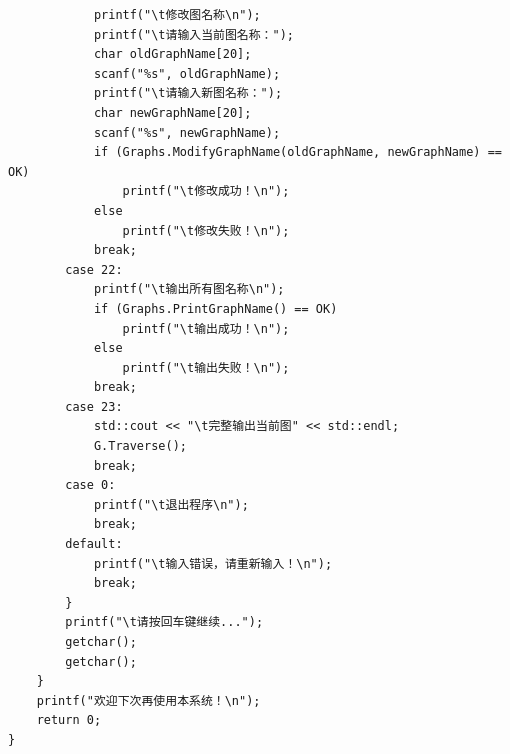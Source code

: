 \documentclass[supercite]{Experimental_Report}
\theoremstyle{definition}
\begin{document}
\begin{lstlisting}
            printf("\t修改图名称\n");
            printf("\t请输入当前图名称：");
            char oldGraphName[20];
            scanf("%s", oldGraphName);
            printf("\t请输入新图名称：");
            char newGraphName[20];
            scanf("%s", newGraphName);
            if (Graphs.ModifyGraphName(oldGraphName, newGraphName) == OK)
                printf("\t修改成功！\n");
            else
                printf("\t修改失败！\n");
            break;
        case 22:
            printf("\t输出所有图名称\n");
            if (Graphs.PrintGraphName() == OK)
                printf("\t输出成功！\n");
            else
                printf("\t输出失败！\n");
            break;
        case 23:
            std::cout << "\t完整输出当前图" << std::endl;
            G.Traverse();
            break;
        case 0:
            printf("\t退出程序\n");
            break;
        default:
            printf("\t输入错误，请重新输入！\n");
            break;
        }
        printf("\t请按回车键继续...");
        getchar();
        getchar();
    }
    printf("欢迎下次再使用本系统！\n");
    return 0;
}
\end{lstlisting}
\end{document}
